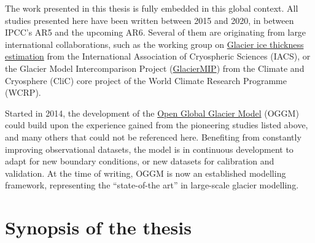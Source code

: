 The work presented in this thesis is fully embedded in this global context. All studies presented here have been written
between 2015 and 2020, in between IPCC’s AR5 and the upcoming AR6. Several of them are originating from large
international collaborations, such as the working group
on \href{https://cryosphericsciences.org/activities/ice-thickness/}{Glacier ice thickness estimation} from the International
Association of Cryospheric Sciences (IACS), or the Glacier Model Intercomparison
Project (\href{https://www.climate-cryosphere.org/mips/glaciermip}{GlacierMIP}) from the Climate and Cryosphere (CliC) core
project of the World Climate Research Programme (WCRP).

Started in 2014, the development of the \href{https://oggm.org}{Open Global Glacier Model} (OGGM) could build upon the
experience gained from the pioneering studies listed above, and many others that could not be referenced here.
Benefiting from constantly improving observational datasets, the model is in continuous development to adapt for new
boundary conditions, or new datasets for calibration and validation. At the time of writing, OGGM is now an established
modelling framework, representing the “state-of-the art” in large-scale glacier modelling.

\section*{Synopsis of the thesis}
%


